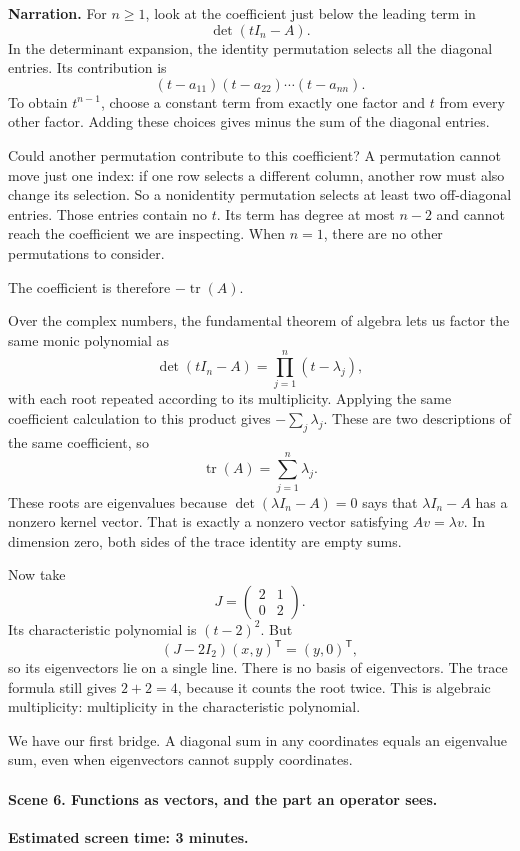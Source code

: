 \textbf{Narration.} For $n\geq1$, look at the coefficient just below the leading term in
\[
\det(tI_n-A).
\]
In the determinant expansion, the identity permutation selects all the diagonal entries. Its contribution is
\[
(t-a_{11})(t-a_{22})\cdots(t-a_{nn}).
\]
To obtain $t^{n-1}$, choose a constant term from exactly one factor and $t$ from every other factor. Adding these choices gives minus the sum of the diagonal entries.

Could another permutation contribute to this coefficient? A permutation cannot move just one index: if one row selects a different column, another row must also change its selection. So a nonidentity permutation selects at least two off-diagonal entries. Those entries contain no $t$. Its term has degree at most $n-2$ and cannot reach the coefficient we are inspecting. When $n=1$, there are no other permutations to consider.

The coefficient is therefore $-\operatorname{tr}(A)$.

Over the complex numbers, the fundamental theorem of algebra lets us factor the same monic polynomial as
\[
\det(tI_n-A)=\prod_{j=1}^n(t-\lambda_j),
\]
with each root repeated according to its multiplicity. Applying the same coefficient calculation to this product gives $-\sum_j\lambda_j$. These are two descriptions of the same coefficient, so
\[
\boxed{\operatorname{tr}(A)=\sum_{j=1}^n\lambda_j.}
\]
These roots are eigenvalues because $\det(\lambda I_n-A)=0$ says that $\lambda I_n-A$ has a nonzero kernel vector. That is exactly a nonzero vector satisfying $Av=\lambda v$. In dimension zero, both sides of the trace identity are empty sums.

Now take
\[
J=\begin{pmatrix}2&1\\0&2\end{pmatrix}.
\]
Its characteristic polynomial is $(t-2)^2$. But
\[
(J-2I_2)(x,y)^{\mathsf{T}}=(y,0)^{\mathsf{T}},
\]
so its eigenvectors lie on a single line. There is no basis of eigenvectors. The trace formula still gives $2+2=4$, because it counts the root twice. This is algebraic multiplicity: multiplicity in the characteristic polynomial.

We have our first bridge. A diagonal sum in any coordinates equals an eigenvalue sum, even when eigenvectors cannot supply coordinates.

\paragraph{Scene 6. Functions as vectors, and the part an operator sees.}
\textbf{Estimated screen time: 3 minutes.}

